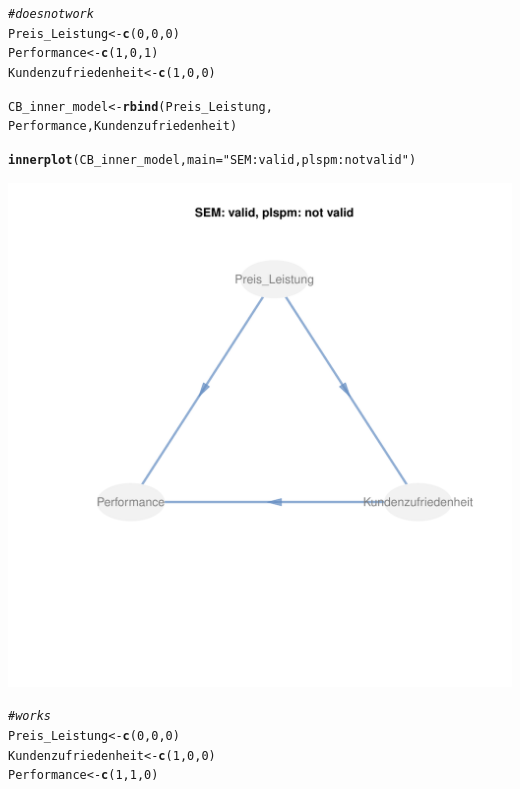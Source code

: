 \documentclass{article}\usepackage[]{graphicx}\usepackage[]{color}
\makeatletter
\def\maxwidth{ %
  \ifdim\Gin@nat@width>\linewidth
    \linewidth
  \else
    \Gin@nat@width
  \fi
}
\newcommand{\hlnum}[1]{\textcolor[rgb]{0.686,0.059,0.569}{#1}}%
\newcommand{\hlstr}[1]{\textcolor[rgb]{0.192,0.494,0.8}{#1}}%
\newcommand{\hlcom}[1]{\textcolor[rgb]{0.678,0.584,0.686}{\textit{#1}}}%
\newcommand{\hlstd}[1]{\textcolor[rgb]{0.345,0.345,0.345}{#1}}%
\newcommand{\hlkwb}[1]{\textcolor[rgb]{0.69,0.353,0.396}{#1}}%
\newcommand{\hlkwc}[1]{\textcolor[rgb]{0.333,0.667,0.333}{#1}}%
\newcommand{\hlkwd}[1]{\textcolor[rgb]{0.737,0.353,0.396}{\textbf{#1}}}%
\newenvironment{kframe}{%
 \def\at@end@of@kframe{}%
 \ifinner\ifhmode%
  \def\at@end@of@kframe{\end{minipage}}%
  \begin{minipage}{\columnwidth}%
 \fi\fi%
 \def\FrameCommand##1{\hskip\@totalleftmargin \hskip-\fboxsep
 \colorbox{shadecolor}{##1}\hskip-\fboxsep
     \hskip-\linewidth \hskip-\@totalleftmargin \hskip\columnwidth}%
 \MakeFramed {\advance\hsize-\width
   \@totalleftmargin\z@ \linewidth\hsize
   \@setminipage}}%
 {\par\unskip\endMakeFramed%
 \at@end@of@kframe}
\newenvironment{knitrout}{}{} %
\makeatother
\begin{document}
\begin{knitrout}
\color{fgcolor}\begin{kframe}
\begin{alltt}
\hlcom{#does not work}
\hlstd{Preis_Leistung} \hlkwb{<-} \hlkwd{c}\hlstd{(}\hlnum{0}\hlstd{,}\hlnum{0}\hlstd{,}\hlnum{0}\hlstd{)}
\hlstd{Performance} \hlkwb{<-} \hlkwd{c}\hlstd{(}\hlnum{1}\hlstd{,}\hlnum{0}\hlstd{,}\hlnum{1}\hlstd{)}
\hlstd{Kundenzufriedenheit} \hlkwb{<-} \hlkwd{c}\hlstd{(}\hlnum{1}\hlstd{,}\hlnum{0}\hlstd{,}\hlnum{0}\hlstd{)}

\hlstd{CB_inner_model} \hlkwb{<-} \hlkwd{rbind}\hlstd{(Preis_Leistung,}
                        \hlstd{Performance, Kundenzufriedenheit)}

\hlkwd{innerplot}\hlstd{(CB_inner_model,} \hlkwc{main}\hlstd{=}\hlstr{"SEM: valid, plspm: not valid"}\hlstd{)}
\end{alltt}
\end{kframe}
\includegraphics[width=\maxwidth]{figure/mis-1} 
\begin{kframe}\begin{alltt}
\hlcom{#works}
\hlstd{Preis_Leistung} \hlkwb{<-} \hlkwd{c}\hlstd{(}\hlnum{0}\hlstd{,}\hlnum{0}\hlstd{,}\hlnum{0}\hlstd{)}
\hlstd{Kundenzufriedenheit} \hlkwb{<-} \hlkwd{c}\hlstd{(}\hlnum{1}\hlstd{,}\hlnum{0}\hlstd{,}\hlnum{0}\hlstd{)}
\hlstd{Performance} \hlkwb{<-} \hlkwd{c}\hlstd{(}\hlnum{1}\hlstd{,}\hlnum{1}\hlstd{,}\hlnum{0}\hlstd{)}


\end{alltt}
\end{kframe}
\end{knitrout}
\end{document}
